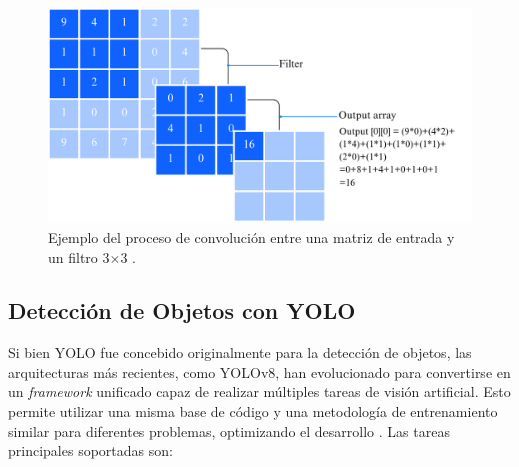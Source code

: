 \begin{figure}[h!]
    \centering
    \includegraphics[width=0.8\linewidth]{Documento/Imagenes/Marco Teorico/CNN.pdf}
    \caption{Ejemplo del proceso de convolución entre una matriz de entrada y un filtro 3×3 \cite{cnnIBM}.}
    \label{fig:cnn_convolution}
\end{figure}

\subsection{Detección de Objetos con YOLO}
\label{subsec:yolo}
Si bien YOLO fue concebido originalmente para la detección de objetos, las arquitecturas más recientes, como YOLOv8, han evolucionado para convertirse en un \textit{framework} unificado capaz de realizar múltiples tareas de visión artificial. Esto permite utilizar una misma base de código y una metodología de entrenamiento similar para diferentes problemas, optimizando el desarrollo \cite{ultralyticsYOLOv8}. Las tareas principales soportadas son:

